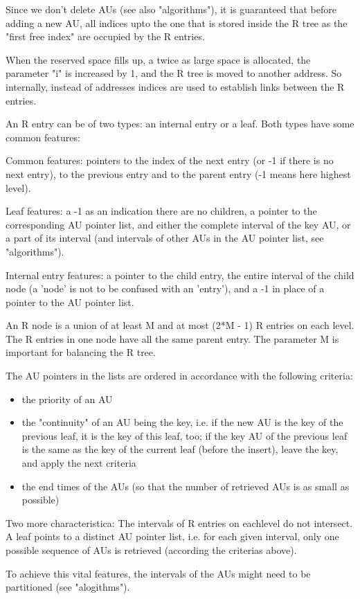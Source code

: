 Since we don't delete AUs (see also "algorithms"), it is guaranteed
that before adding a new AU, all indices upto the one that is stored
inside the R tree as the "first free index" are occupied by the R
entries.

When the reserved space fills up, a twice as large space is allocated,
the parameter "i" is increased by 1, and the R tree is moved to
another address. So internally, instead of addresses indices are used
to establish links between the R entries.

An R entry can be of two types: an internal entry or a leaf. Both
types have some common features:

Common features: pointers to the index of the next entry (or -1 if
there is no next entry), to the previous entry and to the parent entry
(-1 means here highest level).

Leaf features: a -1 as an indication there are no children, a pointer
to the corresponding AU pointer list, and either the complete interval
of the key AU, or a part of its interval (and intervals of other AUs
in the AU pointer list, see "algorithms").

Internal entry features: a pointer to the child entry, the entire
interval of the child node (a 'node' is not to be confused with an
'entry'), and a -1 in place of a pointer to the AU pointer list.

An R node is a union of at least M and at most (2*M - 1) R entries on
each level. The R entries in one node have all the same parent
entry. The parameter M is important for balancing the R tree.

The AU pointers in the lists are ordered in accordance with the
following criteria:
\begin{itemize}
\item the priority of an AU
\item the "continuity" of an AU being the key, i.e. if the new AU is the
 key of the previous leaf, it is the key of this leaf, too; if the key
 AU of the previous leaf is the same as the key of the current leaf
 (before the insert), leave the key, and apply the next criteria
\item the end times of the AUs (so that the number of retrieved AUs is as
 small as possible)
\end{itemize}

Two more characteristica: The intervals of R entries on eachlevel do
 not intersect. A leaf points to a distinct AU pointer list, i.e. for
 each given interval, only one possible sequence of AUs is retrieved
 (according the criterias above).

To achieve this vital features, the intervals of the AUs might need to
be partitioned (see "alogithms").
